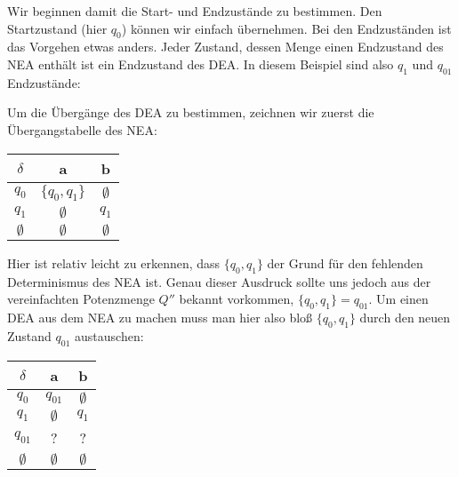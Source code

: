 \begin{flushleft}
Wir beginnen damit die Start- und Endzustände zu bestimmen.
Den Startzustand (hier $q_0$) können wir einfach übernehmen.
Bei den Endzuständen ist das Vorgehen etwas anders.
Jeder Zustand, dessen Menge einen Endzustand des NEA enthält
ist ein Endzustand des DEA.
In diesem Beispiel sind also $q_1$ und $q_{01}$ Endzustände:
\end{flushleft}
    
\begin{center}
\end{center}

\begin{flushleft}
Um die Übergänge des DEA zu bestimmen, zeichnen wir zuerst
die Übergangstabelle des NEA:
\end{flushleft}
    
\begin{center}
\begin{tabular}{|c|c|c|}
    \hline
    $\delta$ & a & b \\
    \hline
    $q_0$ & $\{q_0,q_1\}$ & $\emptyset$ \\
    \hline
    $q_1$ & $\emptyset$ & $q_1$ \\
    \hline
    $\emptyset$ & $\emptyset$ & $\emptyset$ \\
    \hline
\end{tabular}
\end{center}

\begin{flushleft}
Hier ist relativ leicht zu erkennen, dass $\{q_0,q_1\}$ der Grund für den fehlenden 
Determinismus des NEA ist. Genau dieser Ausdruck sollte uns jedoch
aus der vereinfachten Potenzmenge $Q''$ bekannt vorkommen,
$\{q_0,q_1\}=q_{01}$. Um einen DEA aus dem NEA zu machen muss man hier also bloß 
$\{q_0,q_1\}$ durch den neuen Zustand $q_{01}$ austauschen:
\end{flushleft}

\begin{center}
\begin{tabular}{|c|c|c|}
    \hline
    $\delta$ & a & b \\
    \hline
    $q_0$ & $q_{01}$ & $\emptyset$ \\
    \hline
    $q_1$ & $\emptyset$ & $q_1$ \\
    \hline
    $q_{01}$ & ? & ? \\
    \hline
    $\emptyset$ & $\emptyset$ & $\emptyset$ \\
    \hline
\end{tabular}
\end{center}

